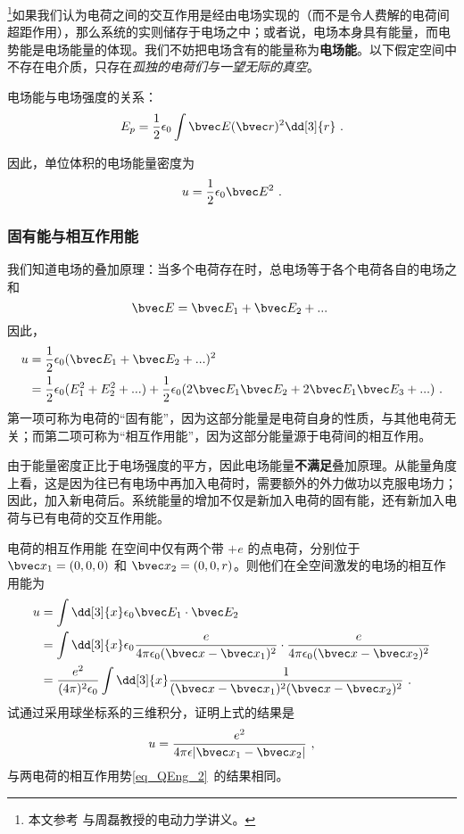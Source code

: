 

\footnote{本文参考 \cite{GriffE} 与周磊教授的电动力学讲义。}如果我们认为电荷之间的交互作用是经由电场实现的（而不是令人费解的电荷间超距作用），那么系统的实则储存于电场之中；或者说，电场本身具有能量，而电势能是电场能量的体现。我们不妨把电场含有的能量称为\textbf{电场能}。以下假定空间中不存在电介质，只存在\textsl{孤独的电荷们与一望无际的真空}。

电场能与电场强度的关系：
\begin{equation}\label{eq_EEng_2}
E_p = \frac12 \epsilon_0 \int \bvec E(\bvec r)^2 \dd[3]{r}~.
\end{equation}

因此，单位体积的电场能量密度为
\begin{equation}
u = \frac12 \epsilon_0 \bvec E^2~.
\end{equation}

\subsubsection{固有能与相互作用能}
我们知道电场的叠加原理：当多个电荷存在时，总电场等于各个电荷各自的电场之和
$$
\bvec E = \bvec E_1 + \bvec E_2 +... ~
$$
因此，
$$
\begin{aligned}
u &= \frac12 \epsilon_0 (\bvec E_1 + \bvec E_2 +... )^2\\
&=\frac12 \epsilon_0(E_1^2+E_2^2+...)+\frac12 \epsilon_0 (2\bvec E_1 \bvec E_2+2\bvec E_1 \bvec E_3+...)~.
\end{aligned}
$$
第一项可称为电荷的“固有能”，因为这部分能量是电荷自身的性质，与其他电荷无关；而第二项可称为“相互作用能”，因为这部分能量源于电荷间的相互作用。

由于能量密度正比于电场强度的平方，因此电场能量\textbf{不满足}叠加原理。从能量角度上看，这是因为往已有电场中再加入电荷时，需要额外的外力做功以克服电场力；因此，加入新电荷后。系统能量的增加不仅是新加入电荷的固有能，还有新加入电荷与已有电荷的交互作用能。
\begin{exercise}{电荷的相互作用能}
在空间中仅有两个带 $+e$ 的点电荷，分别位于 $\bvec x_1=(0,0,0)$ 和 $\bvec x_2=(0,0,r)$。则他们在全空间激发的电场的相互作用能为
\begin{equation}
\begin{aligned}
u&=\int \dd[3]{x} \epsilon_0 \bvec E_1\cdot \bvec E_2\\
&=\int \dd[3]{x} \epsilon_0 \frac{e}{4\pi\epsilon_0(\bvec x-\bvec x_1)^2}\cdot \frac{e}{4\pi\epsilon_0(\bvec x-\bvec x_2)^2}\\
&=\frac{e^2}{(4\pi)^2\epsilon_0} \int\dd[3]{x} \frac{1}{(\bvec x-\bvec x_1)^2(\bvec x-\bvec x_2)^2}~.
\end{aligned}
\end{equation}
试通过采用球坐标系的三维积分，证明上式的结果是
\begin{equation}
u=\frac{e^2}{4\pi \epsilon|\bvec x_1-\bvec x_2|}~,
\end{equation}
与两电荷的相互作用势\autoref{eq_QEng_2}~的结果相同。
\end{exercise}

